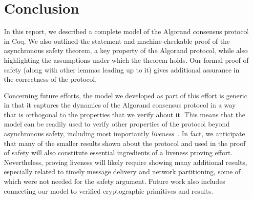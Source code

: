 \section{Conclusion}
\label{sec:conclusion}

In this report, we described a complete model of the Algorand consensus protocol in Coq. We also outlined the statement and machine-checkable proof of the asynchronous safety theorem, a key property of the Algorand protocol, while also highlighting the assumptions under which the theorem holds. Our formal proof of safety (along with other lemmas leading up to it) gives additional assurance in the correctness of the protocol.

Concerning future efforts, the model we developed as part of this effort is generic in that it captures the dynamics of the Algorand consensus protocol in a way that is orthogonal to the properties that we verify about it. This means that the model can be readily used to verify other properties of the protocol beyond asynchronous safety, including most importantly \emph{liveness}~\cite{Chen2019}. In fact, we anticipate that many of the smaller results shown about the protocol and used in the proof of safety will also constitute essential ingredients of a liveness proving effort. Nevertheless, proving liveness will likely require showing many additional results, especially related to timely message delivery and network partitioning, some of which were not needed for the safety argument. Future work also includes connecting our model to verified cryptographic primitives and results.
